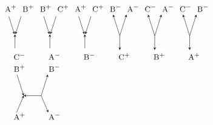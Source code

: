 \documentclass{llncs}
\begin{document}
\begin{figure}
\[
\begin{tikzpicture}[
every node/.style={anchor=base},xscale=.725,yscale=1,
-->/.style={->,shorten >=2pt,shorten <=2pt,>=stealth},
<--/.style={<-,shorten >=2pt,shorten <=2pt,>=stealth},
--->/.style={->,shorten >=1pt,shorten <=1pt,>=stealth},
<---/.style={<-,>=stealth},
]
\node (i1) at (0,0) {$\textsc{\small A}^+$};
\node (ii1) at (1,0) {$\textsc{\small B}^+$};
\node (d1) at (.5,-1) {};
\node (o1) at (.5,-2) {$\textsc{\small C}^-$};
\draw[-->] (i1) -- (d1.center);
\draw[-->] (ii1) -- (d1.center);
\draw[<--] (d1.north) -- (o1);

\node (i2) at (2,0) {$\textsc{\small B}^+$};
\node (ii2) at (3,0) {$\textsc{\small C}^+$};
\node (d2) at (2.5,-1) {};
\node (o2) at (2.5,-2) {$\textsc{\small A}^-$};
\draw[-->] (i2) -- (d2.center);
\draw[-->] (ii2) -- (d2.center);
\draw[<--] (d2.north) -- (o2);

\node (i3) at (4,0) {$\textsc{\small A}^+$};
\node (ii3) at (5,0) {$\textsc{\small C}^+$};
\node (d3) at (4.5,-1) {};
\node (o3) at (4.5,-2) {$\textsc{\small B}^-$};
\draw[-->] (i3) -- (d3.center);
\draw[-->] (ii3) -- (d3.center);
\draw[<--] (d3.north) -- (o3);

\node (i4) at (6,0) {$\textsc{\small B}^-$};
\node (ii4) at (7,0) {$\textsc{\small A}^-$};
\node (d4) at (6.5,-1) {};
\node (o4) at (6.5,-2) {$\textsc{\small C}^+$};
\draw[<-,>=stealth] (i4) -- (d4.center);
\draw[<-,>=stealth] (ii4) -- (d4.center);
\draw[->,>=stealth] (d4.center) -- (o4);

\node (i5) at (8,0) {$\textsc{\small C}^-$};
\node (ii5) at (9,0) {$\textsc{\small A}^-$};
\node (d5) at (8.5,-1) {};
\node (o5) at (8.5,-2) {$\textsc{\small B}^+$};
\draw[<-,>=stealth] (i5) -- (d5.center);
\draw[<-,>=stealth] (ii5) -- (d5.center);
\draw[->,>=stealth] (d5.center) -- (o5);

\node (i6) at (10,0) {$\textsc{\small C}^-$};
\node (ii6) at (11,0) {$\textsc{\small B}^-$};
\node (d6) at (10.5,-1) {};
\node (o6) at (10.5,-2) {$\textsc{\small A}^+$};
\draw[<-,>=stealth] (i6) -- (d6.center);
\draw[<-,>=stealth] (ii6) -- (d6.center);
\draw[->,>=stealth] (d6.center) -- (o6);

\node (i21) at (.5,-2.5) {$\textsc{\small B}^+$};
\node (ii21) at (2.5,-2.5) {$\textsc{\small B}^-$};
\node (d21) at (1,-3.5) {};
\node (dd21) at (2,-3.5) {};
\node (o21) at (.5,-4.5) {$\textsc{\small A}^+$};
\node (oo21) at (2.5,-4.5) {$\textsc{\small A}^-$};
\draw[->,>=stealth] (i21) -- (d21.center);
\draw[<-,>=stealth] (ii21) -- (dd21.center);
\draw[<-,>=stealth] (d21.center) -- (dd21.center);
\draw[<-,>=stealth, shorten >=5pt] (d21.center) -- (o21.center);
\draw[->,>=stealth, shorten >=5pt] (dd21.center) -- (oo21.center);


\end{tikzpicture}\]
\end{figure}
\end{document}

